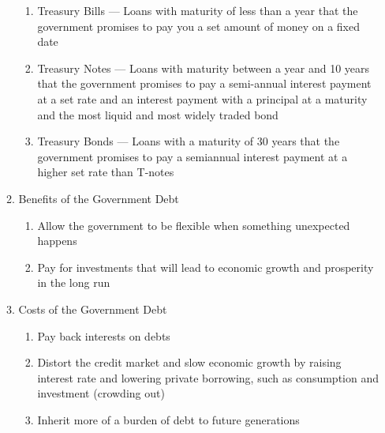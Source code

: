 \documentclass[12pt]{article}
\begin{document}
\begin{enumerate}
\begin{enumerate}
            \begin{enumerate}

              \item Treasury Bills — Loans with maturity of less than a year that the government promises to pay you a set amount of money on a fixed date

              \item Treasury Notes — Loans with maturity between a year and 10 years that the government promises to pay a semi-annual interest payment at a set rate and an interest payment with a principal at a maturity and the most liquid and most widely traded bond

              \item Treasury Bonds — Loans with a maturity of 30 years that the government promises to pay a semiannual interest payment at a higher set rate than T-notes

            \end{enumerate}

          \item Benefits of the Government Debt

            \begin{enumerate}

              \item Allow the government to be flexible when something unexpected happens

              \item Pay for investments that will lead to economic growth and prosperity in the long run

            \end{enumerate}

          \item Costs of the Government Debt

            \begin{enumerate}

              \item Pay back interests on debts

              \item Distort the credit market and slow economic growth by raising interest rate and lowering private borrowing, such as consumption and investment (crowding out)

              \item Inherit more of a burden of debt to future generations

            \end{enumerate}


\end{enumerate}
\end{enumerate}
\end{document}
